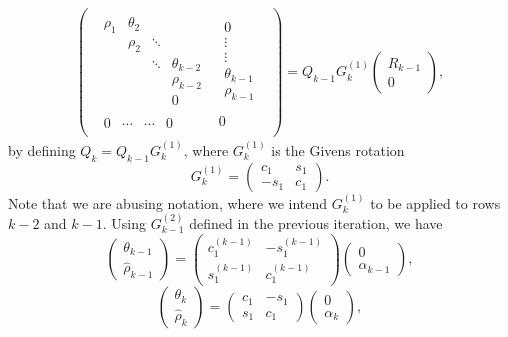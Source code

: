 \documentclass[11pt]{article}
\begin{document}
\begin{eqnarray*}
\begin{pmatrix}\begin{array}{c|c}
\begin{matrix}
 \rho_1    & \theta_2 &         &      \\
            & \rho_2   & \ddots  &      \\
            &          & \ddots  & \theta_{k-2}     \\
            &          &         & \rho_{k-2} \\
		        &          &         & 0 
 \end{matrix}
&  \begin{matrix} 0 \\ \vdots \\ \vdots \\ \theta_{k-1} \\ \rho_{k-1} \end{matrix} \\
\hline
\begin{matrix} 0 & \cdots  & \cdots & 0  \end{matrix} & 0
\end{array}\end{pmatrix} = Q_{k-1} G^{(1)}_k
\begin{pmatrix}
R_{k-1} \\
\hline
0 \end{pmatrix},
\end{eqnarray*}
by defining $Q_k = Q_{k-1}G^{(1)}_k$, where $G^{(1)}_k$ is the Givens rotation
$$G^{(1)}_k = \begin{pmatrix}
c_1 & s_1 \\
-s_1 & c_1
\end{pmatrix}. $$
Note that we are abusing notation, where we intend $G_k^{(1)}$ to be applied to rows $k-2$ and $k-1$. 
Using $G^{(2)}_{k-1}$ defined in the previous iteration, we have
\[ \begin{pmatrix} \theta_{k-1} \\ \hat{\rho}_{k-1} \end{pmatrix}
= \begin{pmatrix}  
c^{(k-1)}_1 & -s^{(k-1)}_1 \\
s^{(k-1)}_1 & c^{(k-1)}_1 \end{pmatrix}
\begin{pmatrix} 0 \\ \alpha_{k-1} \end{pmatrix},
\]
\[
\begin{pmatrix} \theta_{k} \\ \hat{\rho}_{k} \end{pmatrix}
= \begin{pmatrix}  c_1 & -s_1 \\ s_1 & c_1 \end{pmatrix}
\begin{pmatrix} 0 \\ \alpha_{k} \end{pmatrix},
\]
\end{document}
